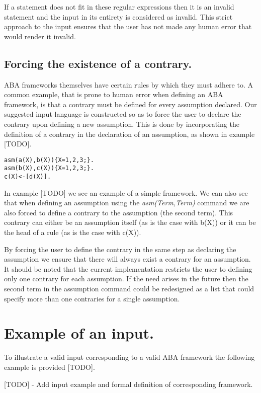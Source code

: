 If a statement does not fit in these regular expressions then it is an invalid statement and the input in its entirety is considered as invalid. This strict approach to the input ensures that the user has not made any human error that would render it invalid.

\subsection{Forcing the existence of a contrary.}

ABA frameworks themselves have certain rules by which they must adhere to. A common example, that is prone to human error when defining an ABA framework, is that a contrary must be defined for every assumption declared. Our suggested input language is constructed so as to force the user to declare the contrary upon defining a new assumption. This is done by incorporating the definition of a contrary in the declaration of an assumption, as shown in example [TODO].

\begin{Verbatim}[frame=single]
asm(a(X),b(X)){X=1,2,3;}.
asm(b(X),c(X)){X=1,2,3;}.
c(X)<-[d(X)].
\end{Verbatim}

In example [TODO] we see an example of a simple framework. We can also see that when defining an assumption using the \emph{asm(Term,Term)} command we are also forced to define a contrary to the assumption (the second term). This contrary can either be an assumption itself (as is the case with b(X)) or it can be the head of a rule (as is the case with c(X)).

By forcing the user to define the contrary in the same step as declaring the assumption we ensure that there will always exist a contrary for an assumption. It should be noted that the current implementation restricts the user to defining only one contrary for each assumption. If the need arises in the future then the second term in the assumption command could be redesigned as a list that could specify more than one contraries for a single assumption.

\section{Example of an input.}

To illustrate a valid input corresponding to a valid ABA framework the following example is provided [TODO].

[TODO] - Add input example and formal definition of corresponding framework.